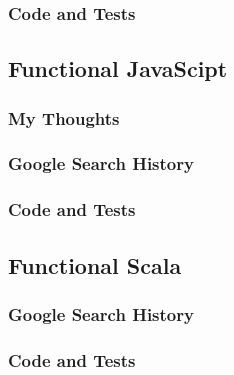 \documentclass[letterpaper, 10pt, DIV=13]{scrartcl}
\numberwithin{equation}{section}
\numberwithin{figure}{section}
\numberwithin{table}{section}
\begin{document}
\subsubsection{Code and Tests}

\subsection{Functional JavaScipt}
\subsubsection{My Thoughts}

\subsubsection{Google Search History}

\subsubsection{Code and Tests}

\subsection{Functional Scala}

\subsubsection{Google Search History}

\subsubsection{Code and Tests}
\end{document}
